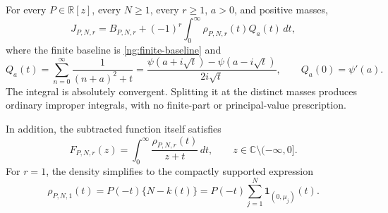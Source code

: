 \begin{theorem}
\label{ng:master}
For every $P\in\mathbb R[z]$, every $N\geq1$, every $r\geq1$,
$a>0$, and positive masses,
\begin{equation}
 \boxed{\displaystyle
 J_{P,N,r}=B_{P,N,r}
          +(-1)^r\int_0^{\infty}\rho_{P,N,r}(t)Q_a(t)\,dt,}
 \label{ng:master-formula}
\end{equation}
where the finite baseline is \eqref{ng:finite-baseline} and
\begin{equation}
 Q_a(t)=\sum_{n=0}^{\infty}\frac1{(n+a)^2+t}
       =\frac{\psi(a+i\sqrt t)-\psi(a-i\sqrt t)}{2i\sqrt t},
 \qquad Q_a(0)=\psi'(a).
 \label{ng:digamma-kernel}
\end{equation}
The integral is absolutely convergent.  Splitting it at the
distinct masses produces ordinary improper integrals, with no
finite-part or principal-value prescription.

In addition, the subtracted function itself satisfies
\begin{equation}
 F_{P,N,r}(z)=\int_0^{\infty}
                         \frac{\rho_{P,N,r}(t)}{z+t}\,dt,
 \qquad z\in\mathbb C\setminus(-\infty,0].
 \label{ng:stieltjes-representation}
\end{equation}
For $r=1$, the density simplifies to the compactly supported
expression
\begin{equation}
 \rho_{P,N,1}(t)=P(-t)\{N-k(t)\}
       =P(-t)\sum_{j=1}^{N}\boldsymbol1_{(0,\mu_j)}(t).
 \label{ng:first-density}
\end{equation}
\end{theorem}


